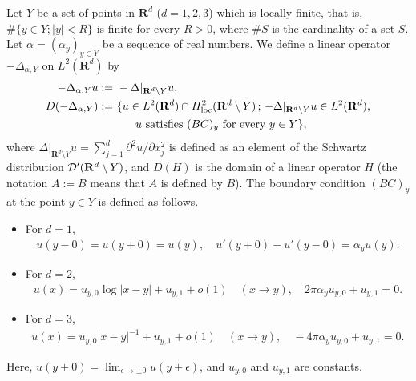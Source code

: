 \documentclass[12pt,a4paper]{article}
\begin{document}
Let $Y$ be a set of points in $\mathbf{R}^d$ ($d=1,2,3$) 
which is locally finite,
that is,
$\#\{y\in Y;|y|<R\}$
is finite for every $R>0$,
where $\#S$ is the cardinality of a set $S$.
Let $\alpha=(\alpha_y)_{y\in Y}$ be a sequence of real numbers.
We define 
a linear operator
$-\Delta_{\alpha,Y}$
on $L^2(\mathbf{R}^d)$ by
\begin{align*}
-\Delta_{\alpha,Y}u
:=&\ -\Delta|_{\mathbf{R}^d\setminus Y} u,\\
D(-\Delta_{\alpha,Y})
:=&\ \{u \in L^2(\mathbf{R}^d)\cap H^2_{\rm loc}(\mathbf{R}^d\setminus Y)
\,;\, -\Delta|_{\mathbf{R}^d\setminus Y} u\in L^2(\mathbf{R}^d),\\
&\qquad
u \mbox{ satisfies }(BC)_y\mbox{ for every }y\in Y
\},
\end{align*}
where 
$\Delta|_{\mathbf{R}^d\setminus Y} u =\sum_{j=1}^d\partial^2 u/\partial x_j^2$ 
is defined as an element of the Schwartz distribution ${\cal D}'(\mathbf{R}^d\setminus Y)$,
and $D(H)$ is the domain of a linear operator $H$
(the notation $A:=B$ means that $A$ is defined by $B$).
The boundary condition $(BC)_y$ at the point $y\in Y$
is defined as follows.
\begin{itemize}
 \item 
For $d=1$,
\begin{align*}
 u(y-0)=u(y+0)=u(y),\quad u'(y+0)-u'(y-0)=\alpha_y u(y).
\end{align*}
\item
For $d=2$,
\begin{align*}
 u(x)=u_{y,0}\log|x-y|+u_{y,1}+o(1)\quad (x\to y),\quad
2\pi\alpha_y u_{y,0}+u_{y,1}=0.
\end{align*}
\item
For $d=3$,
\begin{align*}
u(x)=u_{y,0}|x-y|^{-1}+u_{y,1}+o(1)\quad (x\to y),\quad
-4\pi\alpha_y u_{y,0}+u_{y,1}=0. 
\end{align*}
\end{itemize}
Here, $\displaystyle u(y\pm 0)=\lim_{\epsilon\to \pm 0}u(y\pm\epsilon)$,
and $u_{y,0}$ and $u_{y,1}$ are constants.
\end{document}
